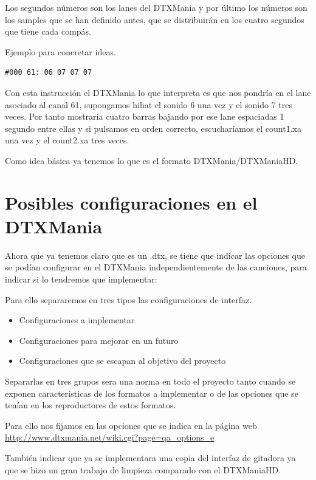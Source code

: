 \documentclass[a4paper,11pt,oneside]{book}
\begin{document}
Los segundos números son los lanes del DTXMania y por último los números son los samples que se han definido antes, que se distribuirán en los cuatro segundos que tiene cada compás.

Ejemplo para concretar ideas.

\begin{Verbatim}[frame=single]
#000 61: 06 07 07 07
\end{Verbatim}


Con esta instrucción el DTXMania lo que interpreta es que nos pondría en el lane asociado al canal 61, supongamos hihat el sonido 6 una vez y el sonido 7 tres veces. Por tanto mostraría cuatro barras bajando por ese lane espaciadas 1 segundo entre ellas y si pulsamos en orden correcto, escucharíamos el count1.xa una vez y el count2.xa tres veces.

Como idea básica ya tenemos lo que es el formato DTXMania/DTXManiaHD.

\chapter{Posibles configuraciones en el DTXMania}

Ahora que ya tenemos claro que es un .dtx, se tiene que indicar las opciones que se podían configurar en el DTXMania independientemente de las canciones, para indicar si lo tendremos que implementar:

Para ello separaremos en tres tipos las configuraciones de interfaz.

\begin{itemize}
  \item Configuraciones a implementar
  \item Configuraciones para mejorar en un futuro
  \item Configuraciones que se escapan al objetivo del proyecto
\end{itemize}

Separarlas en tres grupos sera una norma en todo el proyecto tanto cuando se exponen características de los formatos a implementar o de las opciones que se tenían en los reproductores de estos formatos.

Para ello nos fijamos en las opciones que se indica en la página web \url{http://www.dtxmania.net/wiki.cgi?page=qa_options_e}

También indicar que ya se implementara una copia del interfaz de gitadora ya que se hizo un gran trabajo de limpieza comparado con el DTXManiaHD.
\end{document}
